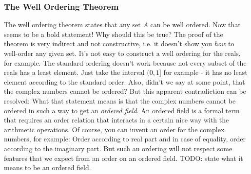 

\subsubsection{The Well Ordering Theorem} 
The well ordering theorem states that any set $A$ can be well ordered. Now that seems to be a bold statement! Why should this be true? The proof of the theorem is very indirect and not constructive, i.e. it doesn't show you \emph{how} to well-order any given set. It's not easy to construct a well ordering for the reals, for example. The standard ordering doesn't work because not every subset of the reals has a least element. Just take the interval $(0,1]$ for example - it has no least element according to the standard order. Also, didn't we say at some point, that the complex numbers cannot be ordered? But this apparent contradiction can be resolved: What that statement means is that the complex numbers cannot be ordered in such a way to get an \emph{ordered field}. An ordered field is a formal term that requires an order relation that interacts in a certain nice way with the arithmetic operations. Of course, you can invent an order for the complex numbers, for example: Order according to real part and in case of equality, order according to the imaginary part. But such an ordering will not respect some features that we expect from an order on an ordered field. TODO: state what it means to be an ordered field.




